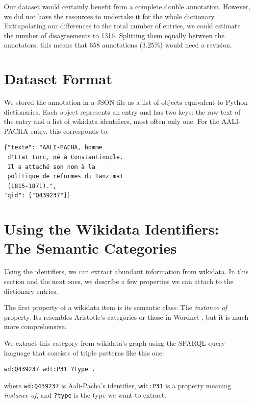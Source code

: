 \documentclass[10pt, a4paper]{article}
\begin{document}
Our dataset would certainly benefit from a complete double annotation. However, we did not have the resources to undertake it for the whole dictionary. Extrapolating our differences to the total number of entries, we could estimate the number of disagreements to 1316. Splitting them equally between the annotators, this means that 658 annotations (3.25\%) would need a revision.

\section{Dataset Format}
We stored the annotation in a JSON file as a list of objects equivalent to Python dictionaries. Each object represents an entry and has two keys: the raw text of the entry and a list of wikidata identifiers, most often only one. For the  AALI-PACHA entry, this corresponds to:
\begin{verbatim}
{"texte": "AALI-PACHA, homme 
 d'Etat turc, né à Constantinople. 
 Il a attaché son nom à la 
 politique de réformes du Tanzimat 
 (1815-1871).", 
"qid": ["Q439237"]}
\end{verbatim}


\section{Using the Wikidata Identifiers: The Semantic Categories}
\label{sec:types}
Using the identifiers, we can extract abundant information from wikidata. In this section and the next ones, we describe a few properties we can attach to the dictionary entries.

The first property of a wikidata item is its semantic class: The \textit{instance of} property. Its resembles Aristotle's categories or those in Wordnet \cite{Miller1993}, but it is much more comprehensive. 

We extract this category from wikidata's graph using the SPARQL query language that consists of triple patterns like this one:
\begin{verbatim}
wd:Q439237 wdt:P31 ?type .
\end{verbatim}
where \verb=wd:Q439237= is Aali-Pacha's identifier, \verb=wdt:P31= is a property meaning \textit{instance of}, and \verb=?type= is the type we want to extract.
\end{document}
